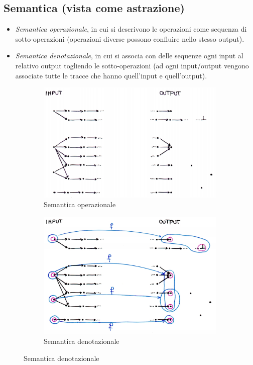 \documentclass[a4paper,oneside,titlepage]{book}
\begin{document}
\subsection{Semantica (vista come astrazione)}
\begin{itemize}
    \item \textit{Semantica operazionale}, in cui si descrivono le operazioni come sequenza di sotto-operazioni (operazioni diverse possono confluire nello stesso output).
    \item \textit{Semantica denotazionale}, in cui si associa con delle sequenze ogni input  al relativo output togliendo le sotto-operazioni (ad ogni input/output vengono associate tutte le tracce che hanno quell'input e quell'output).
\end{itemize}
\begin{figure}[htp]
	\begin{subfigure}{0.49\textwidth}
	    \centering
		\includegraphics[width=\textwidth, height=\textheight, keepaspectratio]{semOp.png} 
		\caption{Semantica operazionale}
	\end{subfigure}
	\hfill
	\begin{subfigure}{0.49\textwidth}
	    \centering
		\includegraphics[width=\textwidth, height=\textheight, keepaspectratio]{semDen.png} 
		\caption{Semantica denotazionale}
	\end{subfigure}
\end{figure}
\end{document}
